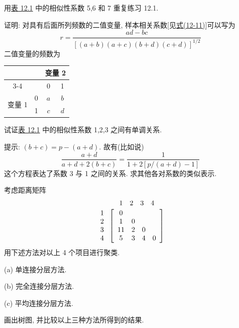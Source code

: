 
\quad 用\hyperref[tab:12.1]{表 12.1} 中的相似性系数 5,6 和 7 重复练习 12.1.

\quad 证明: 对具有后面所列频数的二值变量, 样本相关系数[见\hyperref[eq:12-11]{式(12-11)}]可以写为
\[
r=\frac{ad-bc}{[(a+b)(a+c)(b+d)(c+d)]^{1/2}}
\]
二值变量的频数为

\begin{mvtable}
\setlength{\tabcolsep}{10pt}%
\begin{tabular}{cc|cc}
\toprule
& & \multicolumn{2}{c}{变量 2} \\
\cmidrule(lr){3-4}
& & 0 & 1 \\
\midrule
\multirow{2}{*}{变量 1} & 0 & $a$ & $b$ \\
& 1 & $c$ & $d$ \\
\bottomrule
\end{tabular}
\end{mvtable}

\quad 试证\hyperref[tab:12.1]{表 12.1} 中的相似性系数 1,2,3 之间有单调关系.

提示: $(b+c)=p-(a+d)$. 故有(比如说)
\[
\frac{a+d}{a+d+2(b+c)}=\frac{1}{1+2[p/(a+d)-1]}
\]
这个方程表达了系数 3 与 1 之间的关系. 求其他各对系数的类似表示.

\quad 考虑距离矩阵
\[
\begin{array}{r@{\;}c}
 & \begin{array}{cccc}1&2&3&4\end{array}\\[2pt]
\begin{array}{r}1\\2\\3\\4\end{array} &
\left[\begin{array}{cccc}
0&&&\\
1&0&&\\
11&2&0&\\
5&3&4&0
\end{array}\right]
\end{array}
\]
用下述方法对以上 4 个项目进行聚类.

\noindent (a) 单连接分层方法.

\noindent (b) 完全连接分层方法.

\noindent (c) 平均连接分层方法.

画出树图, 并比较以上三种方法所得到的结果.

